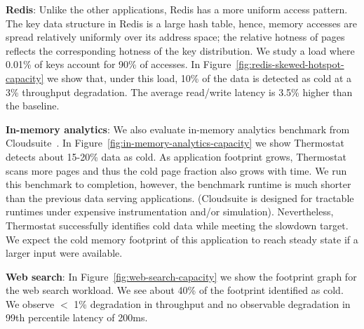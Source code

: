 \textbf{Redis}:
Unlike the other applications, Redis has a more uniform access pattern.
The key data structure in Redis is a large hash table, hence, memory accesses
are spread relatively uniformly over its address space; the relative hotness
of pages reflects the corresponding hotness of the key distribution.
We study a load where 0.01\% of keys account for 90\% of accesses.
In Figure~\ref{fig:redis-skewed-hotspot-capacity} we show that, under this load, 10\% of the data is detected as cold at a 3\% throughput degradation. 
The average read/write latency is 3.5\% higher than the baseline.


\textbf{In-memory analytics}:
We also evaluate in-memory analytics benchmark from
Cloudsuite~\cite{cloudsuite}.  In Figure~\ref{fig:in-memory-analytics-capacity}
we show Thermostat detects about 15-20\% data as cold. As application footprint
grows, Thermostat scans more pages and thus the cold page fraction also grows with time.
We run this benchmark to completion, however, the benchmark runtime is much shorter
than the previous data serving applications. (Cloudsuite is 
designed for tractable runtimes under expensive instrumentation and/or simulation). 
Nevertheless,  Thermostat successfully identifies cold data while meeting the
slowdown target.  We expect the cold memory footprint of this application to 
reach steady state if a larger input were available.

\textbf{Web search}:
In Figure~\ref{fig:web-search-capacity} we show the footprint graph for the web search workload. We see about 40\% of the footprint identified as cold. 
We observe $<$ 1\% degradation in throughput and no observable degradation in 99th
percentile latency of 200ms.

